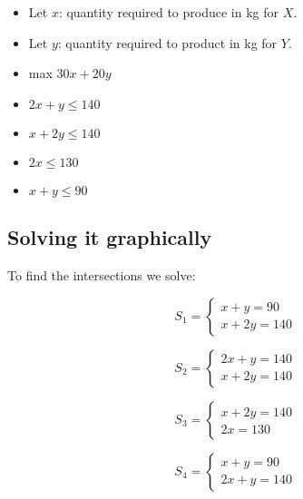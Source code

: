 \documentclass[11pt]{article}
\providecommand{\tightlist}{%
      \setlength{\itemsep}{0pt}\setlength{\parskip}{0pt}}
\begin{document}
    \begin{itemize}
\tightlist
\item
  Let \(x\): quantity required to produce in kg for \(X\).
\item
  Let \(y\): quantity required to product in kg for \(Y\).
\item
  max \(30x + 20y\)
\item
  \(2x+y \leq 140\)
\item
  \(x+2y\leq 140\)
\item
  \(2x \leq 130\)
\item
  \(x + y \leq 90\)
\end{itemize}

    \hypertarget{solving-it-graphically}{%
\subsection{Solving it graphically}\label{solving-it-graphically}}

    To find the intersections we solve:

\[ S_1 = \begin{cases} x+y=90 \\ x+2y=140 \end{cases} \]

\[ S_2 = \begin{cases} 2x+y=140 \\ x+2y=140 \end{cases} \]

\[ S_3 = \begin{cases} x+2y=140 \\ 2x=130 \end{cases} \]

\[ S_4 = \begin{cases} x+y=90 \\ 2x+y=140 \end{cases} \]
\end{document}
